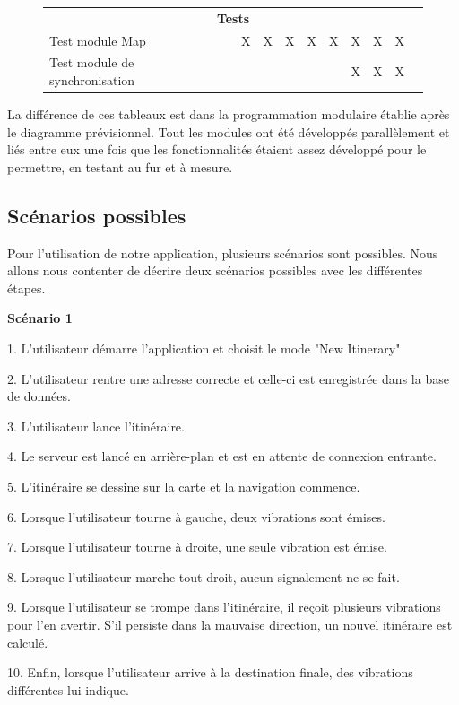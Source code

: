 {\begin{figure}[h]
\begin{tabular}{llllllllllll}
\cline{1-12}
\multicolumn{12}{c}{\textbf{Tests}} 
\\
\cline{1-12}
Test module Map							&   &   & X & X & X & X & X & X & X & X & 
	\\
Test module de synchronisation			&   &   &   &   &   &   &   & X & X & X &
\end{tabular}
\end{figure}
\newpage %
La différence de ces tableaux est dans la programmation modulaire établie après le diagramme prévisionnel. Tout les modules ont été développés parallèlement et liés entre eux une fois que les fonctionnalités étaient assez développé pour le permettre, en testant au fur et à mesure. 

\subsection{Scénarios possibles}
Pour l'utilisation de notre application, plusieurs scénarios sont possibles. Nous allons nous contenter de décrire deux scénarios possibles avec les différentes étapes.


\textbf{Scénario 1}

1. L'utilisateur démarre l'application et choisit le mode "New Itinerary"

2. L'utilisateur rentre une adresse correcte et celle-ci est enregistrée dans la base de données.

3. L'utilisateur lance l'itinéraire.

4. Le serveur est lancé en arrière-plan et est en attente de connexion entrante.

5. L'itinéraire se dessine sur la carte et la navigation commence.

6. Lorsque l'utilisateur tourne à gauche, deux vibrations sont émises.

7. Lorsque l'utilisateur tourne à droite, une seule vibration est émise.

8. Lorsque l'utilisateur marche tout droit, aucun signalement ne se fait.

9. Lorsque l'utilisateur se trompe dans l'itinéraire, il reçoit  plusieurs vibrations pour l'en avertir. S'il persiste dans la mauvaise direction, un nouvel itinéraire est calculé.

10. Enfin, lorsque l'utilisateur arrive à la destination finale, des vibrations différentes lui indique.

}
